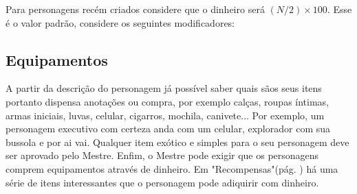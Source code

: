Para personagens recém criados considere que o dinheiro será \( (N/2) \times 100 \). Esse é o valor padrão, considere os seguintes modificadores:

\subsection{Equipamentos}
A partir da descrição do personagem já possível saber quais sãos seus itens portanto dispensa anotações ou compra, por exemplo calças, roupas íntimas, armas iniciais, luvas, celular, cigarros, mochila, canivete... Por exemplo, um personagem executivo com certeza anda com um celular, explorador com sua bussola e por ai vai. Qualquer item exótico e simples para o seu personagem deve ser aprovado pelo Mestre. Enfim, o Mestre pode exigir que os personagens comprem equipamentos através de dinheiro. Em "Recompensas"(pág. \pageref{ch:rewards}) há uma série de itens interessantes que o personagem pode adiquirir com dinheiro.

